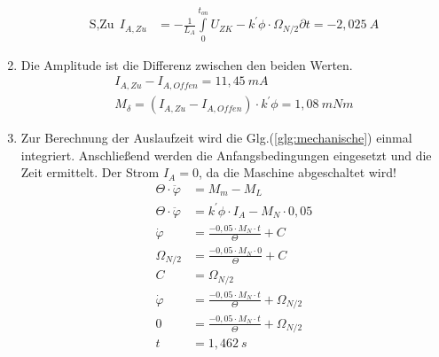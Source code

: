 \begin{solution}
\begin{enumerate}
\begin{align}
\text{S,Zu}~~ I_{A,Zu}&=- \frac{1}{L_A}\int \limits_{0}^{t_{on}} U_{ZK} -k^{'} \phi \cdot \Omega_{N/2} \partial t=-2,025~A
\end{align}
\item Die Amplitude ist die Differenz zwischen den beiden Werten.
\begin{align}
I_{A,Zu}- I_{A,Offen}=11,45~mA\\
M_\delta = (I_{A,Zu}- I_{A,Offen}) \cdot k^{'} \phi = 1,08~mNm
\end{align}
\item Zur Berechnung der Auslaufzeit wird die Glg.(\ref{glg:mechanische}) einmal integriert. Anschließend werden die Anfangsbedingungen eingesetzt und die Zeit ermittelt. Der Strom $I_A =0$, da die Maschine abgeschaltet wird!
\begin{align}
\Theta \cdot \ddot{\varphi} &= M_m - M_L\\
\Theta \cdot \ddot{\varphi} &= k^{'} \phi \cdot I_A - M_N \cdot 0,05\\
\dot{\varphi} &= \frac{-0,05 \cdot M_N \cdot t}{\Theta}+ C\\
\Omega_{N/2} &= \frac{-0,05 \cdot M_N \cdot 0}{\Theta}+ C\\
C&= \Omega_{N/2}\\
\dot{\varphi} &= \frac{-0,05 \cdot M_N \cdot t}{\Theta}+ \Omega_{N/2}\\
0 &= \frac{-0,05 \cdot M_N \cdot t}{\Theta}+ \Omega_{N/2}\\
t &= 1,462~s
\end{align}
\end{enumerate}
\end{solution}